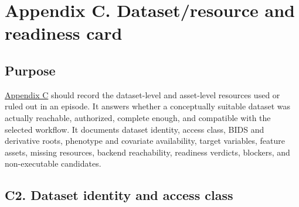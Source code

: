 \section{\texorpdfstring{\textbf{Appendix C. Dataset/resource and readiness card}}{Appendix C. Dataset/resource and readiness card}}\label{appendix-c.-datasetresource-and-readiness-card}\label{app:c}

\subsection{\texorpdfstring{\textbf{Purpose}}{Purpose}}\label{purpose}

\hyperref[app:c]{Appendix C} should record the dataset-level and asset-level resources used or ruled out in an episode. It answers whether a conceptually suitable dataset was actually reachable, authorized, complete enough, and compatible with the selected workflow. It documents dataset identity, access class, BIDS and derivative roots, phenotype and covariate availability, target variables, feature assets, missing resources, backend reachability, readiness verdicts, blockers, and non-executable candidates.

\subsection{\texorpdfstring{\textbf{C2. Dataset identity and access class}}{C2. Dataset identity and access class}}\label{c2.-dataset-identity-and-access-class}

